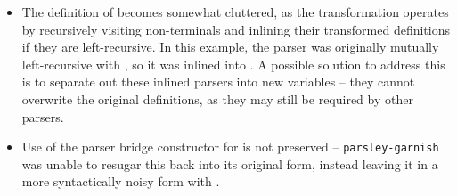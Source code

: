 \documentclass[../../main.tex]{subfiles}
\begin{document}
\begin{itemize}
  \item The definition of  becomes somewhat cluttered, as the transformation operates by recursively visiting non-terminals and inlining their transformed definitions if they are left-recursive. In this example, the  parser was originally mutually left-recursive with , so it was inlined into . A possible solution to address this is to separate out these inlined parsers into new variables -- they cannot overwrite the original definitions, as they may still be required by other parsers.
  \item Use of the parser bridge constructor for  is not preserved -- \texttt{parsley-garnish} was unable to resugar this back into its original form, instead leaving it in a more syntactically noisy form with .
\end{itemize}

\end{document}
